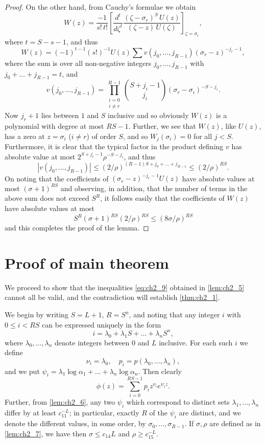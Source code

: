 \begin{proof}
On the other hand, from Cauchy's formulae we obtain
\[
W(z) = \frac{-1}{s!\,t!} \left[ \frac{d^t}{d\zeta^t} \frac{(\zeta - \sigma_r)^S \, U(z)}{(\zeta - z) \, U(\zeta)} \right]_{\zeta = \sigma_r},
\]
where $t = S - s - 1$, and thus
\[
W(z) = (-1)^{t-1} (s!)^{-1} U(z) \sum v(j_0, \dots, j_{R-1}) (\sigma_r - z)^{-j_r - 1},
\]
where the sum is over all non-negative integers $j_0, \dots, j_{R-1}$ with $j_0 + \dots + j_{R-1} = t$, and
\[
v(j_0, \dots, j_{R-1}) = \prod_{\substack{i=0\\i\neq r}}^{R-1} \binom{S+j_i-1}{j_i} (\sigma_r - \sigma_i)^{-S-j_i}.
\]
Now $j_r + 1$ lies between $1$ and $S$ inclusive and so obviously $W(z)$ is a polynomial with degree at most $RS - 1$. Further, we see that $W(z)$, like $U(z)$, has a zero at $z = \sigma_i$ ($i \neq r$) of order $S$, and so $W_j(\sigma_i) = 0$ for all $j < S$. Furthermore, it is clear that the typical factor in the product defining $v$ has absolute value at most $2^{S+j_i-1}\rho^{-S-j_i}$, and thus
\[
|v(j_0, \dots, j_{R-1})| \le (2/\rho)^{(R-1)S+j_0+\dots+j_{R-1}} \le (2/\rho)^{RS}.
\]
On noting that the coefficients of $(\sigma_r - z)^{-j_r - 1} U(z)$ have absolute values at most $(\sigma + 1)^{RS}$ and observing, in addition, that the number of terms in the above sum does not exceed $S^R$, it follows easily that the coefficients of $W(z)$ have absolute values at most
\[
S^R(\sigma+1)^{RS} (2/\rho)^{RS} \le (8\sigma/\rho)^{RS}
\]
and this completes the proof of the lemma.
\end{proof}

\section{Proof of main theorem}

We proceed to show that the inequalities \eqref{eq:ch2_9} obtained in \autoref{lem:ch2_5} cannot all be valid, and the contradiction will establish \autoref{thm:ch2_1}.

We begin by writing $S = L + 1$, $R = S^n$, and noting that any integer $i$ with $0 \le i < RS$ can be expressed uniquely in the form
\[
i = \lambda_0 + \lambda_1 S + \dots + \lambda_n S^n,
\]
where $\lambda_0, \dots, \lambda_n$ denote integers between $0$ and $L$ inclusive. For each such $i$ we define
\[
\nu_i = \lambda_0, \quad p_i = p(\lambda_0, \dots, \lambda_n),
\]
and we put $\psi_i = \lambda_1 \log \alpha_1 + \dots + \lambda_n \log \alpha_n$.
Then clearly
\begin{equation} \label{eq:ch2_10}\tag{10}
\phi(z) = \sum_{i=0}^{RS-1} p_i z^{\nu_i} e^{\psi_i z}.
\end{equation}
Further, from \autoref{lem:ch2_6}, any two $\psi_i$ which correspond to distinct sets $\lambda_1, \dots, \lambda_n$ differ by at least $c_{11}^{-L}$; in particular, exactly $R$ of the $\psi_i$ are distinct, and we denote the different values, in some order, by $\sigma_0, \dots, \sigma_{R-1}$. If $\sigma, \rho$ are defined as in \autoref{lem:ch2_7}, we have then $\sigma \le c_{14} L$ and $\rho \ge c_{15}^{-L}$.

